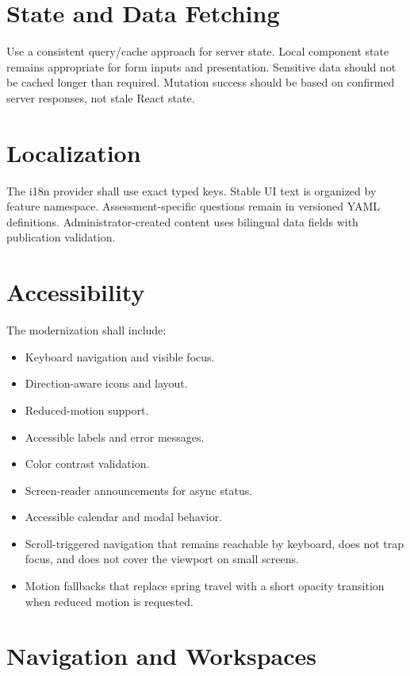 \documentclass[11pt,a4paper,oneside]{report}
\begin{document}
\section{State and Data Fetching}

Use a consistent query/cache approach for server state. Local component state remains appropriate for form inputs and presentation. Sensitive data should not be cached longer than required. Mutation success should be based on confirmed server responses, not stale React state.

\section{Localization}

The i18n provider shall use exact typed keys. Stable UI text is organized by feature namespace. Assessment-specific questions remain in versioned YAML definitions. Administrator-created content uses bilingual data fields with publication validation.

\section{Accessibility}

The modernization shall include:

\begin{itemize}
  \item Keyboard navigation and visible focus.
  \item Direction-aware icons and layout.
  \item Reduced-motion support.
  \item Accessible labels and error messages.
  \item Color contrast validation.
  \item Screen-reader announcements for async status.
  \item Accessible calendar and modal behavior.
  \item Scroll-triggered navigation that remains reachable by keyboard, does not trap focus, and does not cover the viewport on small screens.
  \item Motion fallbacks that replace spring travel with a short opacity transition when reduced motion is requested.
\end{itemize}

\section{Navigation and Workspaces}
\end{document}

